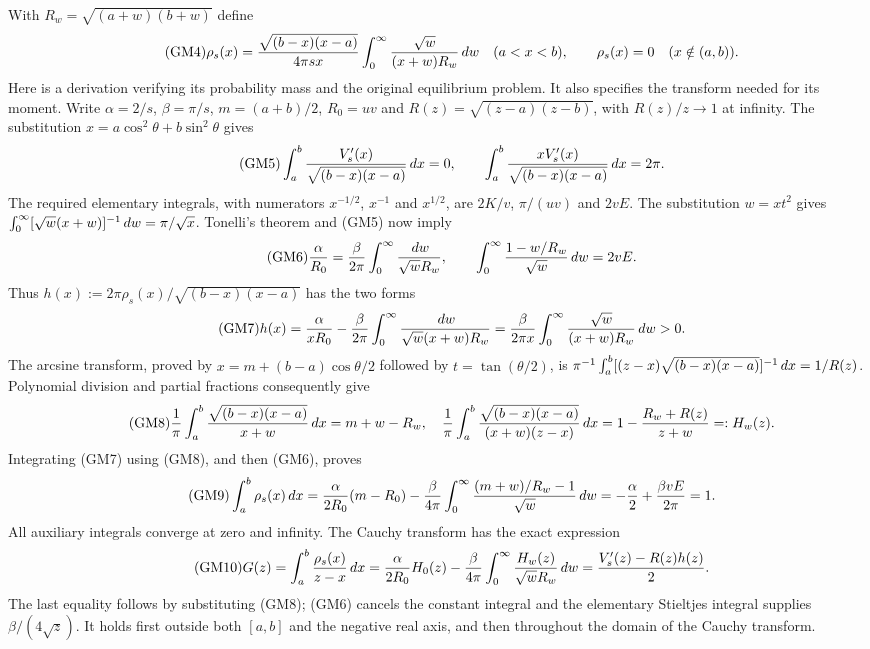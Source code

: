 With $R_w=\sqrt{(a+w)(b+w)}$ define
\begin{equation}\tag{GM4}
 \rho_s(x)=\frac{\sqrt{(b-x)(x-a)}}{4\pi s x}
       \int_0^\infty\frac{\sqrt w}{(x+w)R_w}\,d w\quad(a<x<b),
 \qquad \rho_s(x)=0\quad(x\notin(a,b)).
\end{equation}
Here is a derivation verifying its probability mass and the original
equilibrium problem. It also specifies the transform needed for its moment.
Write $\alpha=2/s$, $\beta=\pi/s$, $m=(a+b)/2$, $R_0=uv$ and
$R(z)=\sqrt{(z-a)(z-b)}$, with $R(z)/z\to1$ at infinity.
The substitution $x=a\cos^2\theta+b\sin^2\theta$ gives
\begin{equation}\tag{GM5}
 \int_a^b\frac{V_s'(x)}{\sqrt{(b-x)(x-a)}}\,d x=0,
 \qquad
 \int_a^b\frac{xV_s'(x)}{\sqrt{(b-x)(x-a)}}\,d x=2\pi.
\end{equation}
The required elementary integrals, with numerators $x^{-1/2}$,
$x^{-1}$ and $x^{1/2}$, are $2K/v$, $\pi/(uv)$ and $2vE$.
The substitution $w=xt^2$ gives
$\int_0^\infty[\sqrt w(x+w)]^{-1}\,d w=\pi/\sqrt x$.
Tonelli's theorem and (GM5) now imply
\begin{equation}\tag{GM6}
 \frac\alpha{R_0}=\frac\beta{2\pi}
       \int_0^\infty\frac{\,d w}{\sqrt wR_w},\qquad
 \int_0^\infty\frac{1-w/R_w}{\sqrt w}\,d w=2vE.
\end{equation}
Thus $h(x):=2\pi\rho_s(x)/\sqrt{(b-x)(x-a)}$ has the two forms
\begin{equation}\tag{GM7}
 h(x)=\frac\alpha{xR_0}-\frac\beta{2\pi}
       \int_0^\infty\frac{\,d w}{\sqrt w(x+w)R_w}
 =\frac\beta{2\pi x}\int_0^\infty\frac{\sqrt w}{(x+w)R_w}\,d w>0.
\end{equation}
The arcsine transform, proved by $x=m+(b-a)\cos\theta/2$ followed
by $t=\tan(\theta/2)$, is
$\pi^{-1}\int_a^b[(z-x)\sqrt{(b-x)(x-a)}]^{-1}\,d x=1/R(z)$.
Polynomial division and partial fractions consequently give
\begin{equation}\tag{GM8}
 \frac1\pi\int_a^b\frac{\sqrt{(b-x)(x-a)}}{x+w}\,d x=m+w-R_w,
 \quad
 \frac1\pi\int_a^b\frac{\sqrt{(b-x)(x-a)}}{(x+w)(z-x)}\,d x
 =1-\frac{R_w+R(z)}{z+w}=:H_w(z).
\end{equation}
Integrating (GM7) using (GM8), and then (GM6), proves
\begin{equation}\tag{GM9}
 \int_a^b\rho_s(x)\,d x
 =\frac\alpha{2R_0}(m-R_0)-\frac\beta{4\pi}
  \int_0^\infty\frac{(m+w)/R_w-1}{\sqrt w}\,d w
 =-\frac\alpha2+\frac{\beta vE}{2\pi}=1.
\end{equation}
All auxiliary integrals converge at zero and infinity. The Cauchy transform
has the exact expression
\begin{equation}\tag{GM10}
 G(z)=\int_a^b\frac{\rho_s(x)}{z-x}\,d x
 =\frac\alpha{2R_0}H_0(z)-\frac\beta{4\pi}
       \int_0^\infty\frac{H_w(z)}{\sqrt wR_w}\,d w
 =\frac{V_s'(z)-R(z)h(z)}2.
\end{equation}
The last equality follows by substituting (GM8); (GM6) cancels the
constant integral and the elementary Stieltjes integral supplies
$\beta/(4\sqrt z)$. It holds first outside both $[a,b]$ and the
negative real axis, and then throughout the domain of the Cauchy transform.

